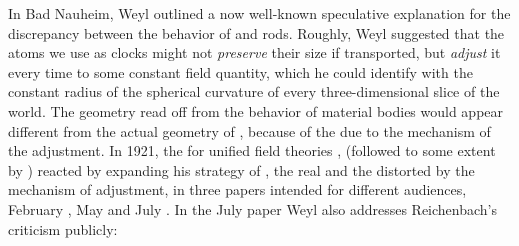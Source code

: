 \documentclass[draft]{article}
\begin{document}
In Bad Nauheim, Weyl outlined a now well-known speculative explanation for the discrepancy between the behavior of  and  rods. Roughly, Weyl suggested that the atoms we use as clocks might not \emph{preserve} their size if transported, but \emph{adjust} it every time to some constant field quantity, which he could identify with the constant radius of the spherical curvature of every three-dimensional slice of the world. The geometry read off from the behavior of material bodies would appear different from the actual geometry of \spti, because of the  due to the mechanism of the adjustment. In 1921, the  for unified field theories \citep[ch.\ 4]{Vizgin1994}, \Weyl (followed to some extent by \cite{Eddington1921,Eddington1921a}) reacted by expanding his strategy of , the real  and the  distorted by the mechanism of adjustment, in three papers intended for different audiences, February \citep{Weyl1921a}, May \citep{Weyl1921d} and July \citep{Weyl1921e}. In the July paper Weyl also addresses Reichenbach's criticism publicly:
\end{document}
